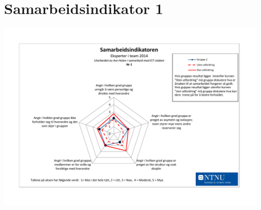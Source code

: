 \section{Samarbeidsindikator 1}
\label{appendix:samarbeidsindikator1}

\begin{center}
\includegraphics[clip=true, width=1 \textwidth,
trim=0cm 0cm 0cm 0cm]{Samarbeidsindikator1.pdf}
\label{fig:indikator1}
\end{center}
